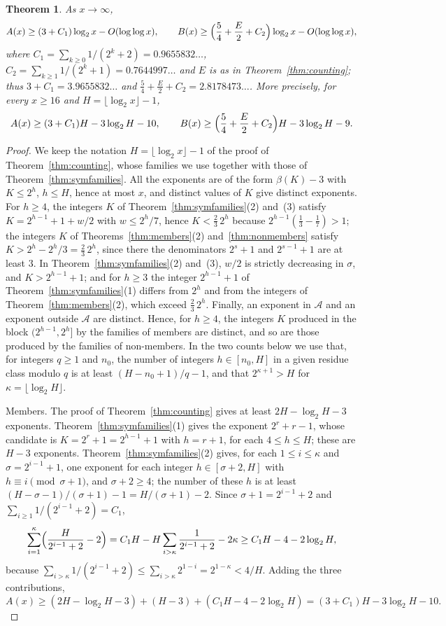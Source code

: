 \documentclass[11pt]{amsart}
\newtheorem{Theorem}{Theorem}[section]
\theoremstyle{definition}
\begin{document}
\begin{Theorem}
\label{thm:counting2}
As $x\to\infty$,
\[
A(x)\ge(3+C_1)\log_2x-O(\log\log x),\qquad B(x)\ge\Bigl(\frac54+\frac E2+C_2\Bigr)\log_2x-O(\log\log x),
\]
where $C_1=\sum_{k\ge0}1/(2^k+2)=0.9655832\ldots$, $C_2=\sum_{k\ge1}1/(2^k+1)=0.7644997\ldots$ and $E$ is as in Theorem~\ref{thm:counting}; thus $3+C_1=3.9655832\ldots$ and $\frac54+\frac E2+C_2=2.8178473\ldots$. More precisely, for every $x\ge16$ and $H=\lfloor\log_2x\rfloor-1$,
\[
A(x)\ge(3+C_1)H-3\log_2H-10,\qquad B(x)\ge\Bigl(\frac54+\frac E2+C_2\Bigr)H-3\log_2H-9.
\]
\end{Theorem}
\begin{proof}
We keep the notation $H=\lfloor\log_2x\rfloor-1$ of the proof of Theorem~\ref{thm:counting}, whose families we use together with those of Theorem~\ref{thm:symfamilies}. All the exponents are of the form $\beta(K)-3$ with $K\le2^h$, $h\le H$, hence at most $x$, and distinct values of $K$ give distinct exponents. For $h\ge4$, the integers $K$ of Theorem~\ref{thm:symfamilies}(2) and~(3) satisfy $K=2^{h-1}+1+w/2$ with $w\le2^h/7$, hence $K<\frac23\,2^h$ because $2^{h-1}(\frac13-\frac17)>1$; the integers $K$ of Theorems~\ref{thm:members}(2) and~\ref{thm:nonmembers} satisfy $K>2^h-2^h/3=\frac23\,2^h$, since there the denominators $2^s+1$ and $2^{s-1}+1$ are at least $3$. In Theorem~\ref{thm:symfamilies}(2) and~(3), $w/2$ is strictly decreasing in $\sigma$, and $K>2^{h-1}+1$; and for $h\ge3$ the integer $2^{h-1}+1$ of Theorem~\ref{thm:symfamilies}(1) differs from $2^h$ and from the integers of Theorem~\ref{thm:members}(2), which exceed $\frac23\,2^h$. Finally, an exponent in $\mathcal{A}$ and an exponent outside $\mathcal{A}$ are distinct. Hence, for $h\ge4$, the integers $K$ produced in the block $(2^{h-1},2^h]$ by the families of members are distinct, and so are those produced by the families of non-members. In the two counts below we use that, for integers $q\ge1$ and $n_0$, the number of integers $h\in[n_0,H]$ in a given residue class modulo $q$ is at least $(H-n_0+1)/q-1$, and that $2^{\kappa+1}>H$ for $\kappa=\lfloor\log_2H\rfloor$.

Members. The proof of Theorem~\ref{thm:counting} gives at least $2H-\log_2H-3$ exponents. Theorem~\ref{thm:symfamilies}(1) gives the exponent $2^r+r-1$, whose candidate is $K=2^r+1=2^{h-1}+1$ with $h=r+1$, for each $4\le h\le H$; these are $H-3$ exponents. Theorem~\ref{thm:symfamilies}(2) gives, for each $1\le i\le\kappa$ and $\sigma=2^{i-1}+1$, one exponent for each integer $h\in[\sigma+2,H]$ with $h\equiv i\pmod{\sigma+1}$, and $\sigma+2\ge4$; the number of these $h$ is at least $(H-\sigma-1)/(\sigma+1)-1=H/(\sigma+1)-2$. Since $\sigma+1=2^{i-1}+2$ and $\sum_{i\ge1}1/(2^{i-1}+2)=C_1$,
\[
\sum_{i=1}^{\kappa}\Bigl(\frac{H}{2^{i-1}+2}-2\Bigr)=C_1H-H\sum_{i>\kappa}\frac{1}{2^{i-1}+2}-2\kappa\ge C_1H-4-2\log_2H,
\]
because $\sum_{i>\kappa}1/(2^{i-1}+2)\le\sum_{i>\kappa}2^{1-i}=2^{1-\kappa}<4/H$. Adding the three contributions,
\[
A(x)\ge(2H-\log_2H-3)+(H-3)+(C_1H-4-2\log_2H)=(3+C_1)H-3\log_2H-10.
\]


\end{proof}
\end{document}
